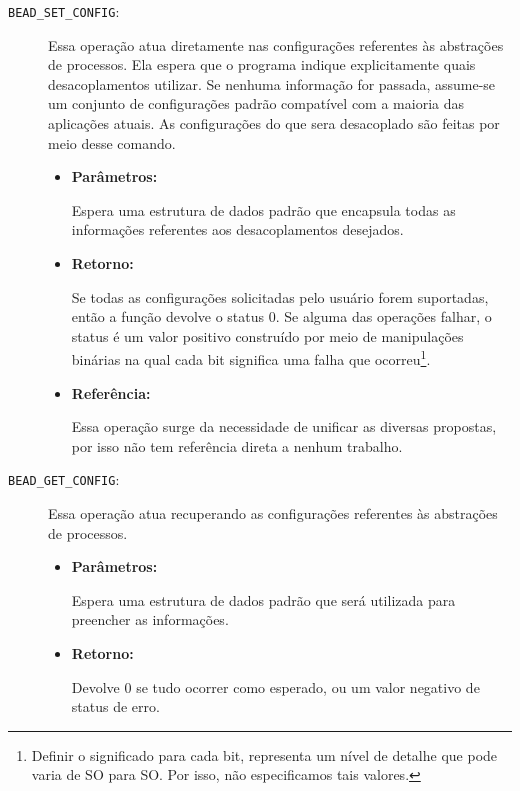 \begin{description}
  \item [\texttt{BEAD\_SET\_CONFIG}:]

Essa operação atua diretamente nas configurações referentes às abstrações de
processos. Ela espera que o programa indique explicitamente quais
desacoplamentos utilizar. Se nenhuma informação for passada, assume-se um
conjunto de configurações padrão compatível com a maioria das aplicações
atuais. As configurações do que sera desacoplado são feitas por meio desse comando.

  \begin{itemize}
    \item \textbf{Parâmetros:}

Espera uma estrutura de dados padrão que encapsula todas as informações
referentes aos desacoplamentos desejados.

    \item \textbf{Retorno:}

Se todas as configurações solicitadas pelo usuário forem suportadas, então a
função devolve o status 0. Se alguma das operações falhar, o status é um valor
positivo construído por meio de manipulações binárias na qual cada bit
significa uma falha que ocorreu\footnote{Definir o significado para cada bit,
representa um nível de detalhe que pode varia de SO para SO. Por isso, não
especificamos tais valores.}. 

    \item \textbf{Referência:}

Essa operação surge da necessidade de unificar as diversas propostas, por isso
não tem referência direta a nenhum trabalho.

  \end{itemize}

  \item [\texttt{BEAD\_GET\_CONFIG}:]

Essa operação atua recuperando as configurações referentes às abstrações de
processos. 

  \begin{itemize}
    \item \textbf{Parâmetros:}

Espera uma estrutura de dados padrão que será utilizada para preencher as
informações.

    \item \textbf{Retorno:}

Devolve 0 se tudo ocorrer como esperado, ou um valor negativo de status de
erro.


\end{itemize}
\end{description}
